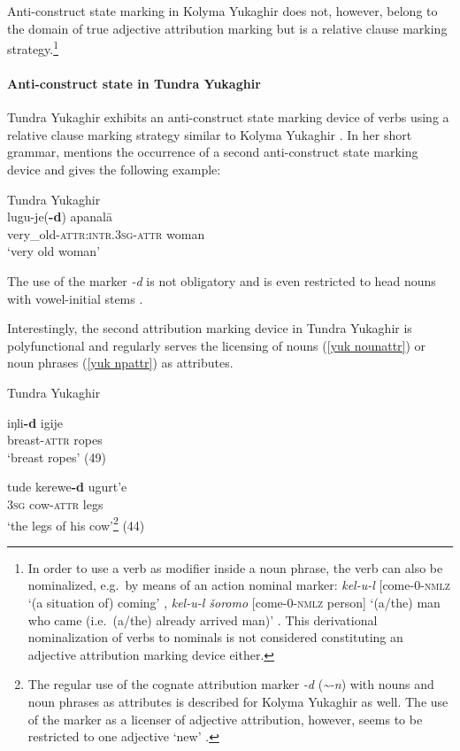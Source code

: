 Anti-construct state marking in Kolyma Yukaghir does not, however, belong to the domain of true adjective attribution marking but is a relative clause marking strategy.\footnote{In order to use a verb as modifier inside a noun phrase, the verb can also be nominalized, e.g.~by means of an action nominal marker: \textit{kel-u-l} [come-0-\textsc{nmlz} ‘(a situation of) coming’ \cite[147]{maslova2003b}, \textit{kel-u-l šoromo} [come-0-\textsc{nmlz} person] ‘(a/the) man who came (i.e.~(a/the) already arrived man)’ \cite[67]{maslova2003b}. This derivational nominalization of verbs to nominals is not considered constituting an adjective attribution marking device either.}

\paragraph{Anti-construct state in Tundra Yukaghir}
Tundra Yukaghir exhibits an anti-construct state marking device of verbs using a relative clause marking strategy similar to Kolyma Yukaghir \citep[49–50, elsewhere]{maslova2003a}. In her short grammar, \cite{maslova2003a} mentions the occurrence of a second anti-construct state marking device and gives the following example:
\begin{exe}
\ex 	
\rm{Tundra Yukaghir \citep[50]{maslova2003a}}\\
\gll 	lugu-je(\textbf{-d}) apanalā\\
	very\_old-\textsc{attr:intr.3sg}-\textsc{attr} woman\\
\glt	‘very old woman’
\end{exe}
The use of the marker \textit{-d} is not obligatory and is even restricted to head nouns with vowel-initial stems \cite[50]{maslova2003a}.

Interestingly, the second attribution marking device in Tundra Yukaghir is polyfunctional and regularly serves the licensing of nouns (\ref{yuk nounattr}) or noun phrases (\ref{yuk npattr}) as attributes.
\begin{exe}
\ex 
\rm{Tundra Yukaghir \citep{maslova2003a}}
\begin{xlist}
\ex
\label{yuk nounattr}
\gll	iŋli\textbf{-d} igije\\
	breast-\textsc{attr} ropes\\
\glt	‘breast ropes’ (49)

\ex
\label{yuk npattr}
\gll	tude kerewe\textbf{-d} ugurt'e\\
	\textsc{3sg} cow-\textsc{attr} legs\\
\glt	‘the legs of his cow’\footnote{The regular use of the cognate attribution marker \textit{-d} (\textit{\textasciitilde-n}) with nouns and noun phrases as attributes is described for Kolyma Yukaghir as well. The use of the marker as a licenser of adjective attribution, however, seems to be restricted to one adjective ‘new’ \citep[71]{maslova2003b}.} (44)
\end{xlist}
\end{exe}

